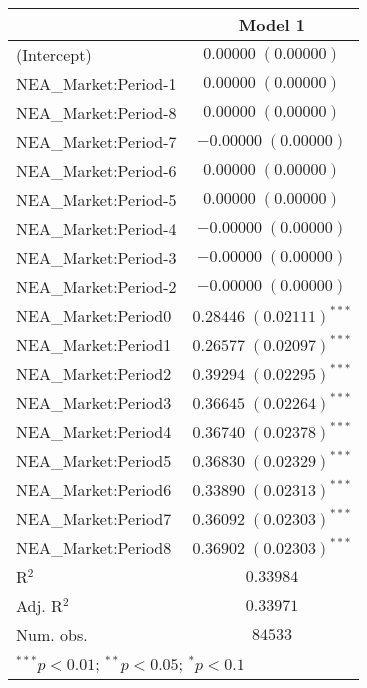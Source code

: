
\begin{tabular}{l c}
\hline
 & Model 1 \\
\hline
(Intercept)          & $0.00000 \; (0.00000)$       \\
NEA\_Market:Period-1 & $0.00000 \; (0.00000)$       \\
NEA\_Market:Period-8 & $0.00000 \; (0.00000)$       \\
NEA\_Market:Period-7 & $-0.00000 \; (0.00000)$      \\
NEA\_Market:Period-6 & $0.00000 \; (0.00000)$       \\
NEA\_Market:Period-5 & $0.00000 \; (0.00000)$       \\
NEA\_Market:Period-4 & $-0.00000 \; (0.00000)$      \\
NEA\_Market:Period-3 & $-0.00000 \; (0.00000)$      \\
NEA\_Market:Period-2 & $-0.00000 \; (0.00000)$      \\
NEA\_Market:Period0  & $0.28446 \; (0.02111)^{***}$ \\
NEA\_Market:Period1  & $0.26577 \; (0.02097)^{***}$ \\
NEA\_Market:Period2  & $0.39294 \; (0.02295)^{***}$ \\
NEA\_Market:Period3  & $0.36645 \; (0.02264)^{***}$ \\
NEA\_Market:Period4  & $0.36740 \; (0.02378)^{***}$ \\
NEA\_Market:Period5  & $0.36830 \; (0.02329)^{***}$ \\
NEA\_Market:Period6  & $0.33890 \; (0.02313)^{***}$ \\
NEA\_Market:Period7  & $0.36092 \; (0.02303)^{***}$ \\
NEA\_Market:Period8  & $0.36902 \; (0.02303)^{***}$ \\
\hline
R$^2$                & $0.33984$                    \\
Adj. R$^2$           & $0.33971$                    \\
Num. obs.            & $84533$                      \\
\hline
\multicolumn{2}{l}{\scriptsize{$^{***}p<0.01$; $^{**}p<0.05$; $^{*}p<0.1$}}
\end{tabular}
